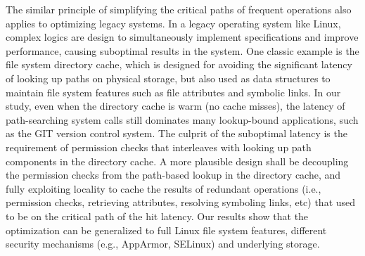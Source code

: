 %


The similar principle of simplifying the critical paths of frequent operations
also applies to optimizing legacy systems.
In a legacy operating system like Linux,
complex logics are design to simultaneously implement specifications
and improve performance,
causing suboptimal results in the system.
One classic example is the file system directory cache,
which is designed for
avoiding the significant latency of looking up paths
on physical storage,
but also used as data structures to maintain file system features
such as file attributes and symbolic links.
In our study, even when the directory cache is warm (no cache misses),
the latency of path-searching system calls
still dominates many lookup-bound applications,
such as the GIT version control system.
The culprit of the suboptimal latency is
the requirement of permission checks that
interleaves with looking up path components in the directory cache.
A more plausible design
shall be decoupling the permission checks
from the path-based lookup in the directory cache,
and fully exploiting locality to cache the results of redundant operations
(i.e., permission checks, retrieving attributes, resolving symboling links, etc)
that used to be on the critical path of the hit latency.
Our results show that the optimization can be generalized
to full Linux file system features,
different security mechanisms (e.g., AppArmor, SELinux)
and underlying storage.



